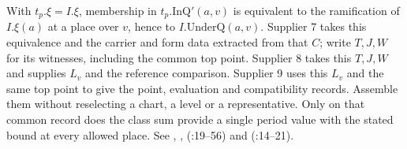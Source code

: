 With $t_p.\xi=I.\xi$, membership in $t_p.\mathrm{InQ}'(a,v)$ is
equivalent to the ramification of $I.\xi(a)$ at a place over $v$,
hence to $I.\mathrm{UnderQ}(a,v)$. Supplier 7 takes this equivalence
and the carrier and form data extracted from that $C$; write $T,J,W$
for its witnesses, including the common top point. Supplier 8 takes
this $T,J,W$ and supplies $L_v$ and the reference comparison. Supplier 9
uses this $L_v$ and the same top point to give the point, evaluation
and compatibility records. Assemble them without reselecting a chart,
a level or a representative. Only on that common record does the
class sum provide a single period value with the stated bound at
every allowed place. See , ,
 (:19--56)
and 
(:14--21).

